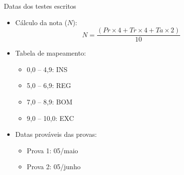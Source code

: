       \begin{slide}[toc=]{Datas dos testes escritos}
         \begin{itemize}
       	    \item Cálculo da nota ($N$):
            \begin{equation*}
               N=\frac{( Pr \times 4 + Tr \times 4 + Ta \times 2 )} {10}
            \end{equation*}
          \item Tabela de mapeamento:
		  \begin{itemize}
			  \item 0,0 -- 4,9:  INS
			  \item 5,0 -- 6,9:  REG
			  \item 7,0 -- 8,9:  BOM
			  \item 9,0 -- 10,0:  EXC
		  \end{itemize}
            \item Datas prováveis das provas:
		    \begin{itemize}
			    \item Prova 1: 05/maio
			    \item Prova 2: 05/junho
		    \end{itemize}
         \end{itemize}
      \end{slide}


